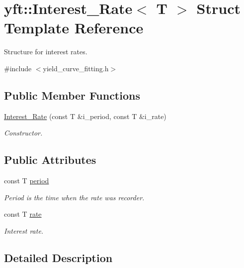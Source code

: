 \hypertarget{structyft_1_1_interest___rate}{}\section{yft\+:\+:Interest\+\_\+\+Rate$<$ T $>$ Struct Template Reference}
\label{structyft_1_1_interest___rate}


Structure for interest rates.  




{\ttfamily \#include $<$yield\+\_\+curve\+\_\+fitting.\+h$>$}

\subsection*{Public Member Functions}
\begin{DoxyCompactItemize}
\item 
\hyperlink{structyft_1_1_interest___rate_a2ed60c2dd9b2823c2cfa3e1ae9066699}{Interest\+\_\+\+Rate} (const T \&i\+\_\+period, const T \&i\+\_\+rate)
\begin{DoxyCompactList}\small\item\em Constructor. \end{DoxyCompactList}\end{DoxyCompactItemize}
\subsection*{Public Attributes}
\begin{DoxyCompactItemize}
\item 
const T \hyperlink{structyft_1_1_interest___rate_adeafaf459ce768f05ae0a74b0b4f8231}{period}
\begin{DoxyCompactList}\small\item\em Period is the time when the rate was recorder. \end{DoxyCompactList}\item 
const T \hyperlink{structyft_1_1_interest___rate_a3ec702c9390d7de88e939c5cfbef7c2c}{rate}
\begin{DoxyCompactList}\small\item\em Interest rate. \end{DoxyCompactList}\end{DoxyCompactItemize}


\subsection{Detailed Description}
